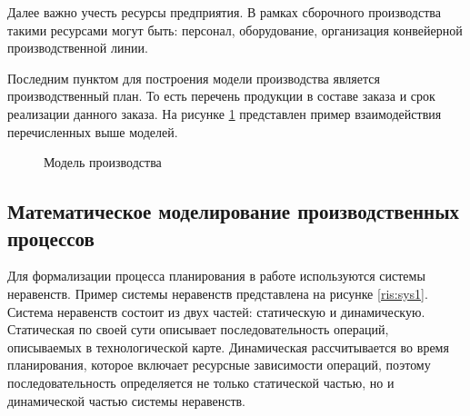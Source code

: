Далее важно учесть ресурсы предприятия. В рамках сборочного производства такими ресурсами могут быть: персонал, оборудование, организация конвейерной производственной линии.

Последним пунктом для построения модели производства является производственный план. То есть перечень продукции в составе заказа и срок реализации данного заказа. На рисунке \ref{ris:Prod1} представлен пример взаимодействия перечисленных выше моделей. 

\begin{figure}[H]
    \caption{Модель производства}
    \label{ris:Prod1}
\end{figure}

\subsection{Математическое моделирование производственных процессов}

Для формализации процесса планирования в работе используются системы неравенств. Пример системы неравенств представлена на рисунке \ref{ris:sys1}. Система неравенств состоит из двух частей: статическую и динамическую. Статическая по своей сути описывает последовательность операций, описываемых в технологической карте. Динамическая рассчитывается во время планирования, которое включает ресурсные зависимости операций, поэтому последовательность определяется не только статической частью, но и динамической частью системы неравенств. 

